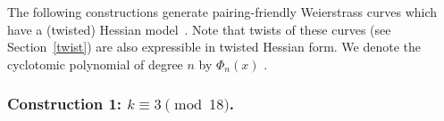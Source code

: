 The following constructions generate pairing-friendly Weierstrass curves
which have a (twisted) Hessian model~\cite[Section 5]{2015/hessian}.
Note that twists of these curves (see Section~\ref{twist}) are also expressible in twisted Hessian form.
We denote the cyclotomic polynomial of degree $n$ by $\Phi_{n}(x)$ .


%


\subsubsection{Construction 1: $k \equiv 3 \pmod{18}$.}
\label{con1}

